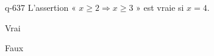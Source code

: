 \begin{truefalse}{q-637}
L'assertion « $x\geq 2 \Rightarrow x \geq 3$ » est vraie si $x=4$.
\item* Vrai
\item Faux
\end{truefalse}

